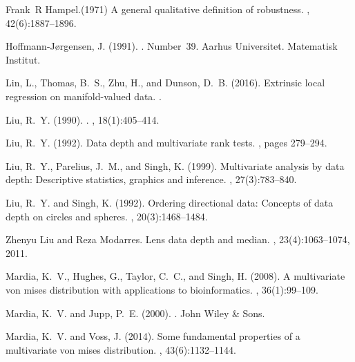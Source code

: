 \documentclass[a4paper]{article}
\numberwithin{equation}{section}
\begin{document}
\begin{thebibliography}{99}
Frank~R Hampel.(1971)
\newblock A general qualitative definition of robustness.
, 42(6):1887--1896.

Hoffmann-J{\o}rgensen, J. (1991).
.
\newblock Number~39. Aarhus Universitet. Matematisk Institut.

Lin, L., Thomas, B.~S., Zhu, H., and Dunson, D.~B. (2016).
\newblock Extrinsic local regression on manifold-valued data.
.

Liu, R.~Y. (1990).
.
, 18(1):405--414.

Liu, R.~Y. (1992).
\newblock Data depth and multivariate rank tests.
,
  pages 279--294.

Liu, R.~Y., Parelius, J.~M., and Singh, K. (1999).
\newblock Multivariate analysis by data depth: Descriptive statistics, graphics
  and inference.
, 27(3):783--840.

Liu, R.~Y. and Singh, K. (1992).
\newblock Ordering directional data: Concepts of data depth on circles and
  spheres.
, 20(3):1468--1484.

Zhenyu Liu and Reza Modarres.
\newblock Lens data depth and median.
, 23(4):1063--1074, 2011.


Mardia, K.~V., Hughes, G., Taylor, C.~C., and Singh, H. (2008).
\newblock A multivariate von mises distribution with applications to
  bioinformatics.
, 36(1):99--109.

Mardia, K.~V. and Jupp, P.~E. (2000).
.
\newblock John Wiley \& Sons.

Mardia, K.~V. and Voss, J. (2014).
\newblock Some fundamental properties of a multivariate von mises distribution.
,
  43(6):1132--1144.


\end{thebibliography}
\end{document}
